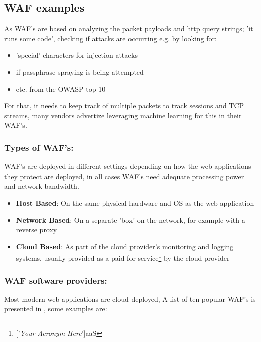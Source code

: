 \documentclass[
	letterpaper, %
	10pt, %
	unnumberedsections, %
	twoside, %
]{APAAssignment}
\begin{document}
\subsection{WAF examples}
As WAF's are based on analyzing the packet payloads and http query strings; 'it runs some code', checking if attacks are occurring e.g. by looking for:

\begin{itemize}
	\item 'special' characters for injection attacks
 	\item if passphrase spraying is being attempted
    \item etc. from the OWASP top 10
\end{itemize} 

For that, it needs to keep track of multiple packets to track sessions and TCP streams, many vendors advertize leveraging machine learning for this in their WAF's\cite{OpenappsecWaf}.

\subsubsection{Types of WAF's:} WAF's are deployed in different settings depending on how the web applications they protect are deployed, in all cases WAF's need adequate processing power and network bandwidth.
\begin{itemize}
	\item{\textbf{Host Based}: On the same physical hardware and OS as the web application}
	\item{\textbf{Network Based}: On a separate 'box' on the network, for example with a reverse proxy}
	\item{\textbf{Cloud Based}: As part of the cloud provider's monitoring and logging systems, usually provided as a paid-for service\footnote{['\textit{Your Acronym Here}']aaS} by the cloud provider} 
\end{itemize}


\subsubsection{WAF software providers:}
Most modern web applications are cloud deployed, A list of ten popular WAF's is presented in \cite{OpenappsecWaf}, some examples are: 
\end{document}
